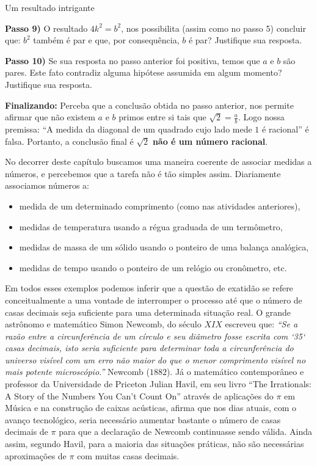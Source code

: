 \begin{task}{Um resultado intrigante}
\begin{enumerate}
\textbf{Passo 9)} O resultado $4k^2=b^2$, nos possibilita (assim como no passo 5) concluir que:  $b^2$ também é par e que, por consequência, $b$ é par? Justifique sua resposta.

\textbf{Passo 10)} Se sua resposta no passo anterior foi positiva, temos que $a$ e $b$ são pares. Este fato contradiz alguma hipótese assumida em algum momento? Justifique sua resposta.

\textbf{Finalizando:} Perceba que a conclusão obtida no passo anterior, nos permite afirmar que não existem $a$ e $b$ primos entre si tais que $\displaystyle\sqrt{2} =\frac{a}{b}$. Logo nossa premissa: “A medida da diagonal de um quadrado cujo lado mede $1$ é racional” é falsa. Portanto, a conclusão final é $\sqrt{2}$ \textbf{não é um número racional}.

\end{enumerate}
\end{task}




\label{\detokenize{NO103-5:organizando-ideias-medicao-e-exatidao}}
No decorrer deste capítulo buscamos uma maneira coerente de associar medidas a números, e percebemos que a tarefa não é tão simples assim. Diariamente associamos números a:
\begin{itemize}
\item {} 
medida de um determinado comprimento (como nas atividades anteriores),

\item {} 
medidas de temperatura usando a régua graduada de um termômetro,

\item {} 
medidas de massa de um sólido usando o ponteiro de uma balança analógica,

\item {} 
medidas de tempo usando o ponteiro de um relógio ou cronômetro, etc.

\end{itemize}

Em todos esses exemplos podemos inferir que a questão de exatidão se refere conceitualmente a uma vontade de interromper o processo até que o número de casas decimais seja suficiente para uma determinada situação real. O grande astrônomo e matemático Simon Newcomb, do século $XIX$ escreveu que:  \emph{“Se a razão entre a circunferência de um círculo e seu diâmetro fosse escrita com {}`35{}` casas decimais, isto seria suficiente para determinar toda a circunferência do universo visível com um erro não maior do que o menor comprimento visível no mais potente microscópio.”} Newcomb ($1882$). Já o matemático contemporâneo e professor da Universidade de Priceton Julian Havil, em seu livro “The Irrationals: A Story of the Numbers You Can’t Count On” através de aplicações do $\pi$ em Música e na construção de caixas acústicas, afirma que nos dias atuais, com o avanço tecnológico, seria necessário aumentar bastante o número de casas decimais de $\pi$ para que a declaração de Newcomb continuasse sendo válida. Ainda assim, segundo Havil, para a maioria das situações práticas, não são necessárias aproximações de $\pi$ com muitas casas decimais.

